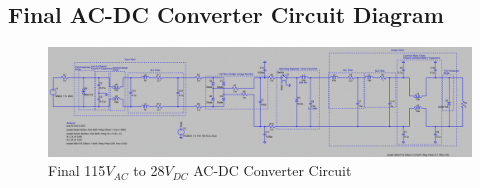 \documentclass[conference]{IEEEtran}
\begin{document}
\begin{appendices}

\onecolumn

\section{Final AC-DC Converter Circuit Diagram}

\begin{figure}[!htb]
    \centering
    \includegraphics[width=\textwidth]{ac_dc_ltspice_final_implementation.png}
    \caption{Final 115$V_{AC}$ to 28$V_{DC}$ AC-DC Converter Circuit}
    \label{fig:ac_dc_ltspice_final_implementation_waveform}
\end{figure}

\end{appendices}
\end{document}
